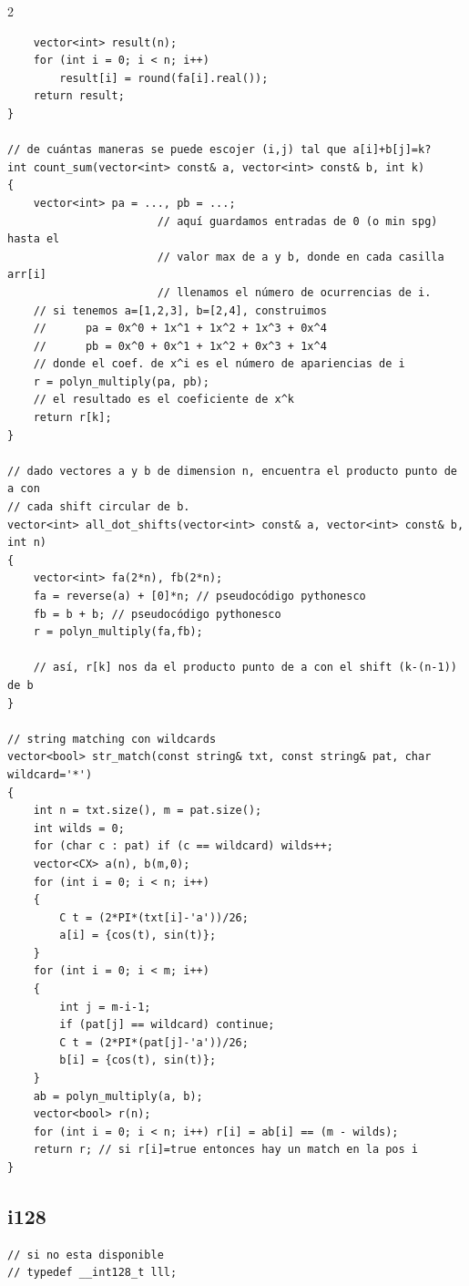 \documentclass[twoside]{article}
\begin{document}
\begin{multicols*}{2}
\begin{verbatim}
    vector<int> result(n);
    for (int i = 0; i < n; i++)
        result[i] = round(fa[i].real());
    return result;
}

// de cuántas maneras se puede escojer (i,j) tal que a[i]+b[j]=k?
int count_sum(vector<int> const& a, vector<int> const& b, int k)
{
    vector<int> pa = ..., pb = ...;
                       // aquí guardamos entradas de 0 (o min spg) hasta el
                       // valor max de a y b, donde en cada casilla arr[i]
                       // llenamos el número de ocurrencias de i.
    // si tenemos a=[1,2,3], b=[2,4], construimos
    //      pa = 0x^0 + 1x^1 + 1x^2 + 1x^3 + 0x^4
    //      pb = 0x^0 + 0x^1 + 1x^2 + 0x^3 + 1x^4
    // donde el coef. de x^i es el número de apariencias de i
    r = polyn_multiply(pa, pb);
    // el resultado es el coeficiente de x^k
    return r[k];
}

// dado vectores a y b de dimension n, encuentra el producto punto de a con
// cada shift circular de b.
vector<int> all_dot_shifts(vector<int> const& a, vector<int> const& b, int n)
{
    vector<int> fa(2*n), fb(2*n);
    fa = reverse(a) + [0]*n; // pseudocódigo pythonesco
    fb = b + b; // pseudocódigo pythonesco
    r = polyn_multiply(fa,fb);

    // así, r[k] nos da el producto punto de a con el shift (k-(n-1)) de b
}

// string matching con wildcards
vector<bool> str_match(const string& txt, const string& pat, char wildcard='*')
{
    int n = txt.size(), m = pat.size();
    int wilds = 0;
    for (char c : pat) if (c == wildcard) wilds++;
    vector<CX> a(n), b(m,0);
    for (int i = 0; i < n; i++)
    {
        C t = (2*PI*(txt[i]-'a'))/26;
        a[i] = {cos(t), sin(t)};
    }
    for (int i = 0; i < m; i++)
    {
        int j = m-i-1;
        if (pat[j] == wildcard) continue;
        C t = (2*PI*(pat[j]-'a'))/26;
        b[i] = {cos(t), sin(t)};
    }
    ab = polyn_multiply(a, b);
    vector<bool> r(n);
    for (int i = 0; i < n; i++) r[i] = ab[i] == (m - wilds);
    return r; // si r[i]=true entonces hay un match en la pos i
}

\end{verbatim}

	{
		\subsection*{i128}
	}
	\begin{verbatim}
// si no esta disponible
// typedef __int128_t lll;


\end{verbatim}
\end{multicols*}
\end{document}
